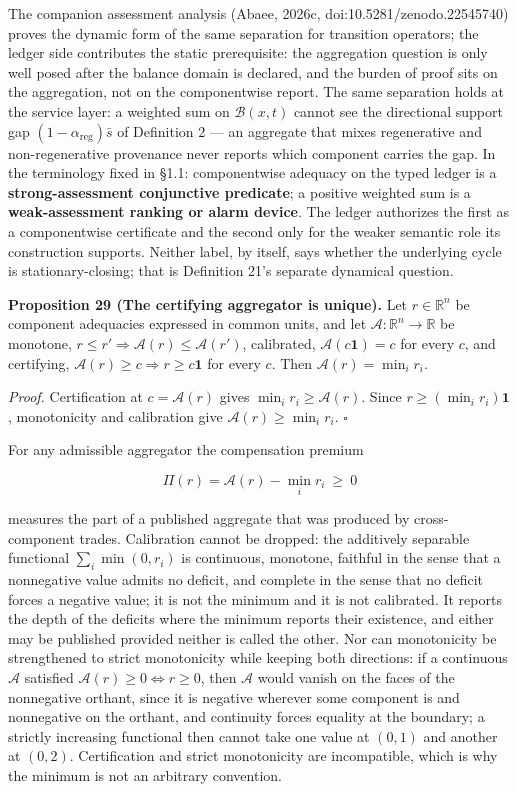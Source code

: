 \documentclass[11pt]{article}
\begin{document}
The companion assessment analysis (Abaee, 2026c, doi:10.5281/\allowbreak{}zenodo.22545740) proves the dynamic form of the same separation for transition operators; the ledger side contributes the static prerequisite: the aggregation question is only well posed after the balance domain is declared, and the burden of proof sits on the aggregation, not on the componentwise report. The same separation holds at the service layer: a weighted sum on \(\mathcal{B}(x,t)\) cannot see the directional support gap \((1 - \alpha_{\mathrm{reg}})\bar s\) of Definition 2 --- an aggregate that mixes regenerative and non-regenerative provenance never reports which component carries the gap. In the terminology fixed in \S1.1: componentwise adequacy on the typed ledger is a \textbf{strong-assessment conjunctive predicate}; a positive weighted sum is a \textbf{weak-assessment ranking or alarm device}. The ledger authorizes the first as a componentwise certificate and the second only for the weaker semantic role its construction supports. Neither label, by itself, says whether the underlying cycle is stationary-closing; that is Definition 21's separate dynamical question.

\textbf{Proposition 29 (The certifying aggregator is unique).} Let \(r\in\mathbb R^{n}\) be component adequacies expressed in common units, and let \(\mathcal A:\mathbb R^{n}\to\mathbb R\) be monotone, \(r\le r'\Rightarrow\mathcal A(r)\le\mathcal A(r')\), calibrated, \(\mathcal A(c\mathbf 1)=c\) for every \(c\), and certifying, \(\mathcal A(r)\ge c\Rightarrow r\ge c\mathbf 1\) for every \(c\). Then \(\mathcal A(r)=\min_ir_i\).

\emph{Proof.} Certification at \(c=\mathcal A(r)\) gives \(\min_ir_i\ge\mathcal A(r)\). Since \(r\ge(\min_ir_i)\mathbf 1\), monotonicity and calibration give \(\mathcal A(r)\ge\min_ir_i\). \(\square\)

For any admissible aggregator the compensation premium 

$$\Pi(r)=\mathcal A(r)-\min_ir_i\ \ge\ 0$$

 measures the part of a published aggregate that was produced by cross-component trades. Calibration cannot be dropped: the additively separable functional \(\sum_i\min(0,r_i)\) is continuous, monotone, faithful in the sense that a nonnegative value admits no deficit, and complete in the sense that no deficit forces a negative value; it is not the minimum and it is not calibrated. It reports the depth of the deficits where the minimum reports their existence, and either may be published provided neither is called the other. Nor can monotonicity be strengthened to strict monotonicity while keeping both directions: if a continuous \(\mathcal A\) satisfied \(\mathcal A(r)\ge0\Leftrightarrow r\ge0\), then \(\mathcal A\) would vanish on the faces of the nonnegative orthant, since it is negative wherever some component is and nonnegative on the orthant, and continuity forces equality at the boundary; a strictly increasing functional then cannot take one value at \((0,1)\) and another at \((0,2)\). Certification and strict monotonicity are incompatible, which is why the minimum is not an arbitrary convention.
\end{document}
